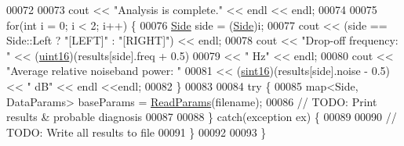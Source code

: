 \begin{DoxyCode}
00072 
00073     cout << \textcolor{stringliteral}{"Analysis is complete."} << endl << endl;
00074 
00075     \textcolor{keywordflow}{for}(\textcolor{keywordtype}{int} i = 0; i < 2; i++) \{
00076         \hyperlink{namespacevaso_a77c5d9704657d49d456f691ddd8abf7c}{Side} side = (\hyperlink{namespacevaso_a77c5d9704657d49d456f691ddd8abf7c}{Side})i;
00077         cout << (side == Side::Left ? \textcolor{stringliteral}{"[LEFT]"} : \textcolor{stringliteral}{"[RIGHT]"}) << endl;
00078         cout << \textcolor{stringliteral}{"Drop-off frequency: "} << (\hyperlink{definitions_8hpp_a05f6b0ae8f6a6e135b0e290c25fe0e4e}{uint16})(results[side].freq + 0.5)
00079             << \textcolor{stringliteral}{" Hz"} << endl;
00080         cout << \textcolor{stringliteral}{"Average relative noiseband power: "}
00081             << (\hyperlink{definitions_8hpp_a74df79fde3c518e55b29ce6360a9c76e}{sint16})(results[side].noise - 0.5) << \textcolor{stringliteral}{" dB"} << endl <<endl;
00082     \}
00083 
00084     \textcolor{keywordflow}{try} \{
00085         map<Side, DataParams> baseParams = \hyperlink{namespacevaso_afc1435dcb9c37b3ccde589738b26c909}{ReadParams}(filename);
00086         \textcolor{comment}{// TODO: Print results & probable diagnosis}
00087 
00088     \} \textcolor{keywordflow}{catch}(exception ex) \{
00089         
00090         \textcolor{comment}{// TODO: Write all results to file}
00091     \}
00092     
00093 \}
\end{DoxyCode}
